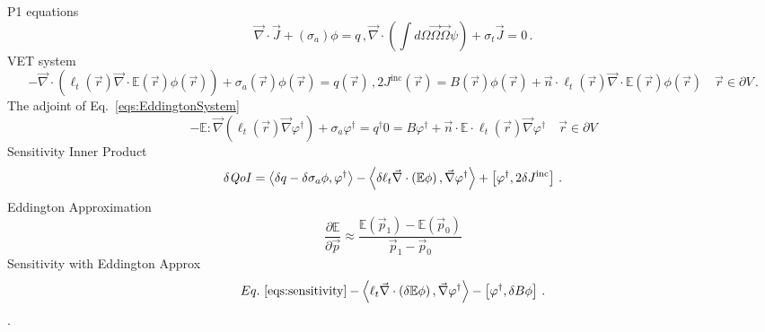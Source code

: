 \documentclass[review]{elsarticle}
\newcommand{\vr}{\vec{r}}
\newcommand{\vp}{\vec{p}}
\newcommand{\vO}{\vec{\Omega}}
\newcommand{\bra}{\left\langle}
\newcommand{\ket}{\right\rangle}
\newcommand{\sbra}{\left[}
\newcommand{\sket}{\right]}
\renewcommand{\div}{\vec{\nabla} \cdot}
\newcommand{\grad}{\vec{\nabla}}
\newcommand{\vefadj}{\varphi^\dag}
\newcommand{\bound}{\partial V}
\newcommand{\vn}{\vec{n}}
\newcommand{\Edd}{\mathbb{E}}
\newcommand{\BEdd}{B}
\newcommand{\sigt}{\sigma_t}
\newcommand{\siga}{\sigma_a}
\newcommand{\isigt}{\ell_t}
\newcommand{\scalSource}{q}
\newcommand{\scalResp}{q^\dag}
\newcommand{\qoi}{{\it QoI}\xspace}
\begin{document}
{P1 equations
\begin{subequations}
%
\begin{equation}
\label{0am}
\div \vec{J} + (\siga) \phi = \scalSource \,,
\end{equation}
\begin{equation}
\label{1am}
\div \left(  \int d\Omega \vO \vO \psi \right) + \sigt \vec{J} = 0 \,.
\end{equation}
%
\end{subequations}
VET system
\begin{subequations} \label{eqs:EddingtonSystem}
\begin{equation} \label{eq:EddingtonVol}
- \div \left( \isigt(\vr)\div \Edd(\vr) \phi(\vr) \right) + \siga(\vr) \phi(\vr) = \scalSource(\vr) \,,
\end{equation}
\begin{equation} \label{eq:EddingtonBC}
2 J^{\text{inc}}(\vr) = \BEdd(\vr) \phi(\vr) + \vn \cdot \isigt(\vr) \div \Edd(\vr) \phi(\vr)  \quad \vr \in \bound \,.
\end{equation}
\end{subequations}
The adjoint of Eq.~\eqref{eqs:EddingtonSystem}
\begin{subequations}\label{eqs:EddingtonAdjSystem}
\begin{equation}\label{eq:EddingtonAdjVol}
- \Edd : \grad \left( \isigt(\vr)\grad \vefadj \right)  + \siga \vefadj = \scalResp
\end{equation}
\begin{equation}\label{eq:EddingtonAdjBC}
0 = B \vefadj+ \vn \cdot
\Edd \cdot \isigt(\vr) \vec{\nabla} \vefadj    \quad \vr \in \bound
\end{equation}
\end{subequations}
Sensitivity Inner Product
\begin{equation}\label{eqs:sensitivity}
\delta \qoi =  \bra \delta \scalSource - \delta \siga \phi, \vefadj \ket  - \bra \delta \isigt \div \left( \Edd \phi \right) , \grad \vefadj \ket
 + \sbra \vefadj, 2 \delta J^{\text{inc}} \sket \,.
\end{equation}
Eddington Approximation
\begin{equation}
\label{Eddapprox}
\frac{\partial \Edd}{\partial \vp} \approx \frac{\Edd(\vp_1) - \Edd(\vp_0)}{\vp_1 - \vp_0}
\end{equation}
Sensitivity with Eddington Approx
\begin{equation}
\label{EddErr}
 Eq.~\eqref{eqs:sensitivity}- \bra  \isigt \div \left( \delta \Edd \phi \right), \grad \vefadj \ket
- \sbra \vefadj, \delta \BEdd \phi \sket \,.
\end{equation} 
.}
\end{document}
